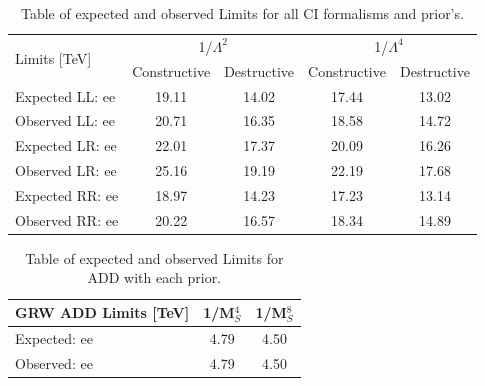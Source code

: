     \begin {table}[h]
        \begin{center}
        \begin{tabular}{  l | c | c | c | c  } 
            \hline
            \hline
            \multirow{2}{*}{Limits [TeV]} & \multicolumn{2}{c|}{1/$\Lambda^2$} & \multicolumn{2}{c}{1/$\Lambda^4$} \\
            \cline{2-5}
             & Constructive & Destructive & Constructive & Destructive \\
            \hline
            Expected LL: ee       & 19.11 & 14.02 & 17.44 & 13.02 \\
            Observed LL: ee       & 20.71 & 16.35 & 18.58 & 14.72 \\
            \hline
            Expected LR: ee       & 22.01 & 17.37 & 20.09 & 16.26 \\
            Observed LR: ee       & 25.16 & 19.19 & 22.19 & 17.68 \\
            \hline
            Expected RR: ee       & 18.97 & 14.23 & 17.23 & 13.14 \\
            Observed RR: ee       & 20.22 & 16.57 & 18.34 & 14.89 \\
            \hline
            \hline
        \end{tabular}
        \caption{Table of expected and observed Limits for all CI formalisms and prior's.}
        \label{tab:limits_CI}
        \end{center}
    \end {table}


    \begin {table}[h]
        \begin{center}
        \begin{tabular}{ l | c | c } 
            \hline
            \hline
            GRW ADD Limits [TeV] & 1/M$_S^4$ & 1/M$_S^8$ \\
            \hline
            Expected: ee & 4.79 & 4.50 \\
            Observed: ee & 4.79 & 4.50 \\
            \hline
            \hline
        \end{tabular}
        \caption{Table of expected and observed Limits for ADD with each prior.}
        \label{tab:limits_ADD}
        \end{center}
    \end {table}





